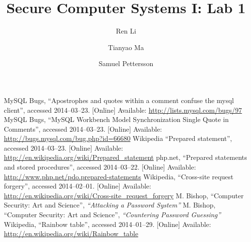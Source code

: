 \documentclass{article}
\title{\textbf{Secure Computer Systems I: Lab 1}}
\author{Ren Li \and Tianyao Ma \and Samuel Pettersson}
\begin{document}
\maketitle



\begin{thebibliography}{9}
  MySQL Bugs,
  ``Apostrophes and quotes within a comment confuse the mysql client'',
  accessed 2014--03--23.
  [Online]
  Available: \url{http://lists.mysql.com/bugs/97}
  MySQL Bugs,
  ``MySQL Workbench Model Synchronization Single Quote in Comments'',
  accessed 2014--03--23.
  [Online]
  Available: \url{http://bugs.mysql.com/bug.php?id=66680}
  Wikipedia
  ``Prepared statement'',
  accessed 2014--03--23.
  [Online]
  Available: \url{http://en.wikipedia.org/wiki/Prepared_statement}
  php.net,
  ``Prepared statements and stored procedures'',
  accessed 2014--03--22.
  [Online]
  Available: \url{http://www.php.net/pdo.prepared-statements}
  Wikipedia,
  ``Cross-site request forgery'',
  accessed 2014--02--01.
  [Online]
  Available: \url{http://en.wikipedia.org/wiki/Cross-site_request_forgery}
  M. Bishop,
  ``Computer Security: Art and Science'',
  \textit{``Attacking a Password System''}
  M. Bishop,
  ``Computer Security: Art and Science'',
  \textit{``Countering Password Guessing''}
  Wikipedia,
  ``Rainbow table'',
  accessed 2014--01--29.
  [Online]
  Available: \url{http://en.wikipedia.org/wiki/Rainbow_table}
\end{thebibliography}
\end{document}
